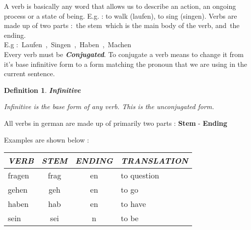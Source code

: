 \documentclass[a4paper,12pt]{article}
\newtheorem{mydef}{Definition}
\begin{document}
A verb is basically any word that allows us to describe an action, an ongoing
process or a state of being. E.g. : to walk (laufen), to sing (singen).
Verbs are made up of two parts : the stem which is the main body of the verb,
and the ending.\\

\noindent
E.g : Laufen , Singen , Haben , Machen\\

Every verb must be \textbf{\textit{Conjugated}}. To conjugate a verb means to
change it from it's base infinitive form to a form matching the pronoun that we
are using in the current sentence.

\begin{mydef}{\bf{Infinitive}}
\begin{defn-background}

Infinitive is the base form of any verb. This is the unconjugated form.

\end{defn-background}
\end{mydef}
\vspace{0.25cm}

All verbs in german are made up of primarily two parts : 
\noindent
\color{goethe_green} \textbf{Stem} \color{black} - 
\color{burntorange} \textbf{Ending} \color{black}

Examples are shown below :\\

\vspace{0.3cm}
\begin{tabular}{l|c c|l}

\toprule
\cellcolor{lightgray} \textbf{\textit{VERB}}   &
\cellcolor{lightgray} \textbf{\textit{STEM}}   &
\cellcolor{lightgray} \textbf{\textit{ENDING}} &
\cellcolor{lightgray} \textbf{\textit{TRANSLATION}} \\
\midrule

\cellcolor{white} fragen &
\cellcolor{white} frag   &
\cellcolor{white} en     &
\cellcolor{white} to question     \\

\cellcolor{white} gehen &
\cellcolor{white} geh   &
\cellcolor{white} en    &
\cellcolor{white} to go     \\

\cellcolor{white} haben &
\cellcolor{white} hab   &
\cellcolor{white} en    &
\cellcolor{white} to have     \\

\cellcolor{white} sein &
\cellcolor{white} sei  &
\cellcolor{white} n    &
\cellcolor{white} to be     \\


\bottomrule
\end{tabular}
\vspace{0.3cm}
\newline
\end{document}
